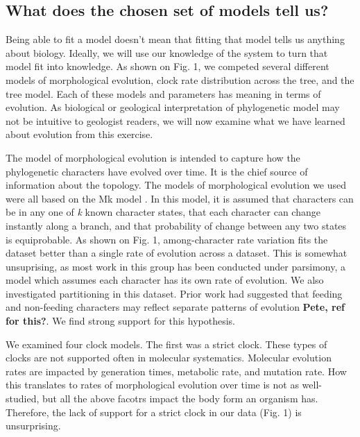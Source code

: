 \documentclass{article}
\begin{document}
\subsection{What does the chosen set of models tell us?}

Being able to fit a model doesn't mean that fitting that model tells us anything about biology. 
Ideally, we will use our knowledge of the system to turn that model fit into knowledge. 
As shown on Fig. 1, we competed several different models of morphological evolution, clock rate distribution across the tree, and the tree model. 
Each of these models and parameters has meaning in terms of evolution. 
As biological or geological interpretation of phylogenetic model may not be intuitive to geologist readers, we will now examine what we have learned about evolution from this exercise.

The model of morphological evolution is intended to capture how the phylogenetic characters have evolved over time.
It is the chief source of information about the topology.
The models of morphological evolution we used were all based on the Mk model \citep{Lewis2001}. 
In this model, it is assumed that characters can be in any one of \textit{k} known character states, that each character can change instantly along a branch, and that probability of change between any two states is equiprobable.
As shown on Fig. 1, among-character rate variation fits the dataset better than a single rate of evolution across a dataset.
This is somewhat unsuprising, as most work in this group has been conducted under parsimony, a model which assumes each character has its own rate of evolution.
We also investigated partitioning in this dataset.
Prior work had suggested that feeding and non-feeding characters may reflect separate patterns of evolution \textbf{Pete, ref for this?}.
We find strong support for this hypothesis.

We examined four clock models.
The first was a strict clock. 
These types of clocks are not supported often in molecular systematics.
Molecular evolution rates are impacted by generation times,  metabolic rate, and mutation rate.
How this translates to rates of morphological evolution over time is not as well-studied, but all the above facotrs impact the body form an organism has.
Therefore, the lack of support for a strict clock in our data (Fig. 1) is unsurprising.
\end{document}
